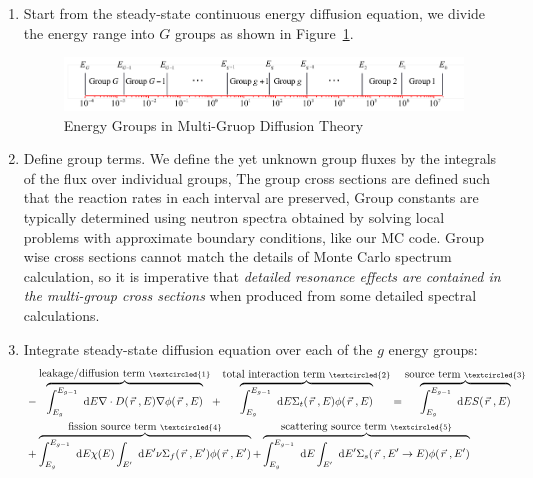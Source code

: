 \documentclass{school-22.211-notes}
\date{April 2, 2012}
\begin{document}
\maketitle

 \label{multi-group-diffusion}
\begin{enumerate}
\item Start from the steady-state continuous energy diffusion equation, we divide the energy range into $G$ groups as shown in Figure~\ref{energy-groups}. 
\begin{figure}[ht]
  \centering
  \includegraphics[width=6in]{images/dfs/energy-group.png}
  \caption{Energy Groups in Multi-Gruop Diffusion Theory} \label{energy-groups}
\end{figure}

\item Define group terms. We define the yet unknown group fluxes by the integrals of the flux over individual groups,
The group cross sections are defined such that the reaction rates in each interval are preserved,
Group constants are typically determined using neutron spectra obtained by solving local problems with approximate boundary conditions, like our MC code. Group wise cross sections cannot match the details of Monte Carlo spectrum calculation, so it is imperative that \textit{detailed resonance effects are contained in the multi-group cross sections} when produced from some detailed spectral calculations. 

\item Integrate steady-state diffusion equation over each of the $g$ energy groups: 
\begin{align}
& - \overbrace{\int_{E_g}^{E_{g-1}} \dE \divergence D(\vecr, E) \gradient \phi(\vecr, E)}^{\mbox{leakage/diffusion term }\textcircled{1}} + 
\overbrace{\int_{E_g}^{E_{g-1}} \dE \Sigma_t(\vecr, E) \phi(\vecr, E)}^{\mbox{total interaction term }\textcircled{2}} = \overbrace{\int_{E_g}^{E_{g-1}} \dE S(\vecr, E)}^{\mbox{source term } \textcircled{3}}  \\
& + \overbrace{\int_{E_g}^{E_{g-1}} \dE \chi(E) \int_{E'} \dE' \nu \Sigma_f (\vecr, E') \phi(\vecr, E')}^{\mbox{fission source term }\textcircled{4}} 
 + \overbrace{\int_{E_g}^{E_{g-1}} \dE \int_{E'} \dE' \Sigma_s(\vecr, E'\to E) \phi(\vecr, E')}^{\mbox{scattering source term }\textcircled{5}} 
\end{align}


\end{enumerate}
\end{document}
